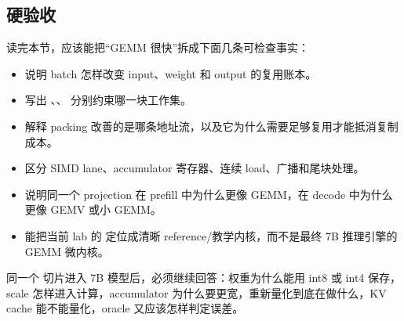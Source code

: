 \subsection{硬验收}

读完本节，应该能把“GEMM 很快”拆成下面几条可检查事实：

\begin{itemize}
  \item 说明 batch 怎样改变 input、weight 和 output 的复用账本。
  \item 写出 、、 分别约束哪一块工作集。
  \item 解释 packing 改善的是哪条地址流，以及它为什么需要足够复用才能抵消复制成本。
  \item 区分 SIMD lane、accumulator 寄存器、连续 load、广播和尾块处理。
  \item 说明同一个 projection 在 prefill 中为什么更像 GEMM，在 decode 中为什么更像 GEMV 或小 GEMM。
  \item 能把当前 lab 的  定位成清晰 reference/教学内核，而不是最终 7B 推理引擎的 GEMM 微内核。
\end{itemize}

同一个  切片进入 7B 模型后，必须继续回答：权重为什么能用 int8 或 int4 保存，scale 怎样进入计算，accumulator 为什么要更宽，重新量化到底在做什么，KV cache 能不能量化，oracle 又应该怎样判定误差。
